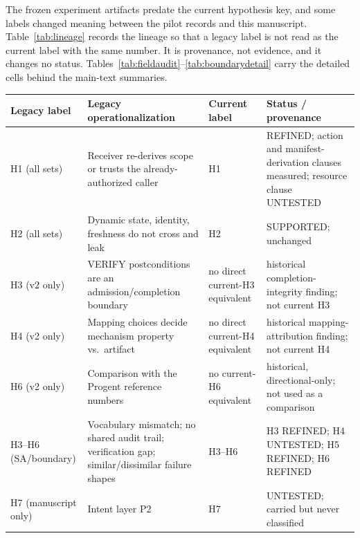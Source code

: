 \documentclass[sigconf,anonymous,nonacm]{acmart}
\newcommand{\code}[1]{\texttt{\detokenize{#1}}}
\newcommand{\status}[1]{\textsc{#1}}
\begin{document}
The frozen experiment artifacts predate the current hypothesis key, and some labels changed meaning between the pilot records and this manuscript. Table~\ref{tab:lineage} records the lineage so that a legacy label is not read as the current label with the same number. It is provenance, not evidence, and it changes no status. Tables~\ref{tab:fieldaudit}--\ref{tab:boundarydetail} carry the detailed cells behind the main-text summaries.

\begin{center}
\label{tab:lineage}
\scriptsize
\begin{tabular}{@{}p{}p{}p{}p{}@{}}
\toprule
Legacy label & Legacy operationalization & Current label & Status / provenance \\
\midrule
H1 (all sets) & Receiver re-derives scope or trusts the already-authorized caller & H1 & \status{REFINED}; action and manifest-derivation clauses measured; resource clause \status{UNTESTED} \\
H2 (all sets) & Dynamic state, identity, freshness do not cross and leak & H2 & \status{SUPPORTED}; unchanged \\
H3 (v2 only) & VERIFY postconditions are an admission/completion boundary & no direct current-H3 equivalent & historical completion-integrity finding; not current H3 \\
H4 (v2 only) & Mapping choices decide mechanism property vs.\ artifact & no direct current-H4 equivalent & historical mapping-attribution finding; not current H4 \\
H6 (v2 only) & Comparison with the Progent reference numbers & no current-H6 equivalent & historical, directional-only; not used as a comparison \\
H3--H6 (SA/boundary) & Vocabulary mismatch; no shared audit trail; verification gap; similar/dissimilar failure shapes & H3--H6 & H3 \status{REFINED}; H4 \status{UNTESTED}; H5 \status{REFINED}; H6 \status{REFINED} \\
H7 (manuscript only) & Intent layer P2 & H7 & \status{UNTESTED}; \code{intent_text} carried but never classified \\
\bottomrule
\end{tabular}
\end{center}
\end{document}
